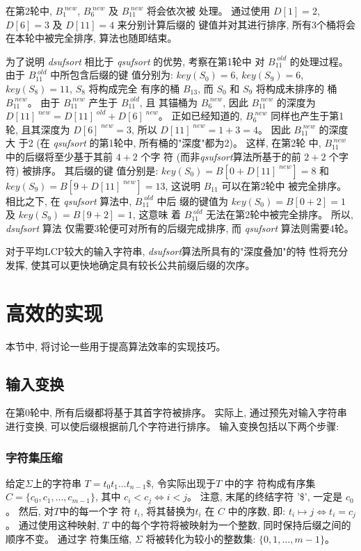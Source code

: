 在第2轮中, $B_1^{\;new}$, $B_6^{\;new}$ 及 $B_{11}^{\;new}$ 将会依次被
处理。 通过使用 $D[1] = 2$, $D[6] = 3$ 及 $D[11] = 4$ 来分别计算后缀的
键值并对其进行排序, 所有3个桶将会在本轮中被完全排序, 算法也随即结束。

为了说明 \emph{dsufsort} 相比于 \emph{qsufsort} 的优势, 考察在第1轮中
对 $B_{11}^{\;old}$ 的处理过程。 由于 $B_{11}^{\;old}$ 中所包含后缀的键
值分别为: $key(S_0)=6$, $key(S_9)=6$, $key(S_8) = 11$, $S_8$ 将构成完全
有序的桶 $B_{13}$, 而 $S_0$ 和 $S_9$ 将构成未排序的
桶 $B_{11}^{\;new}$。 由于 $B_{11}^{\;new}$ 产生于 $B_{11}^{\;old}$, 且
其锚桶为 $B_6^{\;new}$, 因此 $B_{11}^{\;new}$ 的深度为
$D[11]^{\;new} = D[11]^{\;old} + D[6]^{\;new}$。 正如已经知道的,
$B_6^{\;new}$ 同样也产生于第1轮, 且其深度为 $D[6]^{\;new} =
3$, 所以 $D[11]^{\;new} = 1 + 3 = 4$。 因此 $B_{11}^{\;new}$ 的深度大
于2 (在 \emph{qsufsort} 的第1轮中, 所有桶的"深度"都为2)。 这样, 在第2轮
中, $B_{11}^{\;new}$ 中的后缀将至少基于其前 $4+2$ 个字
符 (而非\emph{qsufsort}算法所基于的前 $2+2$ 个字符) 被排序。 其后缀的键
值分别是: $key(S_0)=B[0+D[11] ^{\;new}]=
8$ 和 $key(S_9)=B[9+D[11]^{\;new}]= 13$, 这说明 $B_{11}$ 可以在第2轮中
被完全排序。 相比之下, 在 \emph{qsufsort} 算法中, $B_{11}^{\;old}$ 中后
缀的键值为 $key(S_0) = B[0+2] = 1$ 及 $key(S_9) = B[9+2] = 1$, 这意味
着 $B_{11}^{\;old}$ 无法在第2轮中被完全排序。 所以, \emph{dsufsort} 算法
仅需要3轮便可对所有的后缀完成排序, 而 \emph{qsufsort} 算法则需要4轮。

对于平均LCP较大的输入字符串, \emph{dsufsort}算法所具有的"深度叠加"的特
性将充分发挥, 使其可以更快地确定具有较长公共前缀后缀的次序。


\section{高效的实现}

本节中, 将讨论一些用于提高算法效率的实现技巧。

\subsection{输入变换}

在第0轮中, 所有后缀都将基于其首字符被排序。 实际上, 通过预先对输入字符串
进行变换, 可以使后缀根据前几个字符进行排序。 输入变换包括以下两个步骤:

\subsubsection{字符集压缩}

给定$\Sigma$上的字符串 $T = t_0t_1...t_{n-1}\$$, 令实际出现于$T$ 中的字
符构成有序集 $C = \{c_0, c_1,\dots, c_{m-1}\}$, 其中 $c_i < c_j \iff i
< j$。 注意, 末尾的终结字符 '\$', 一定是 $c_0$。 然后, 对$T$中的每一个字
符 $t_i$, 将其替换为$t_i$ 在 $C$ 中的序数, 即: $t_i \mapsto j \iff t_i
= c_j$。 通过使用这种映射,
$T$ 中的每个字符将被映射为一个整数, 同时保持后缀之间的顺序不变。 通过字
符集压缩, $\Sigma$ 将被转化为较小的整数集: $\{0,1,\dots,m-1\}$。


